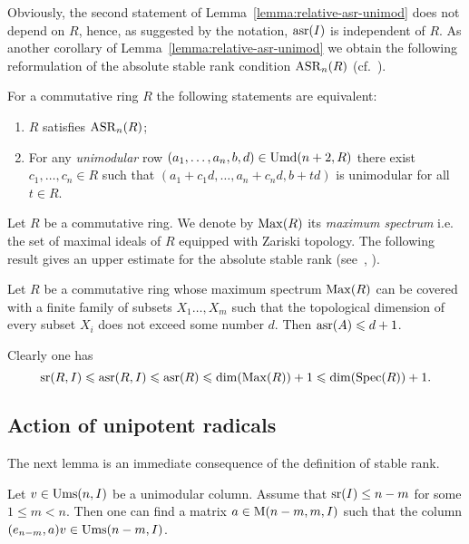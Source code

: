 Obviously, the second statement of Lemma~\ref{lemma:relative-asr-unimod} does not depend on $R$, hence, as suggested by the notation, $\operatorname{asr}(I)$ is independent of $R$.
As another corollary of Lemma~\ref{lemma:relative-asr-unimod} we obtain the following reformulation of the absolute stable rank condition $\operatorname{ASR}_n(R)$ (cf.~\cite[\S~1]{Pl98}).
\begin{cor}[A.~Bak] For a commutative ring $R$ the following statements are equivalent:
\begin{enumerate}
 \item\label{asr_Stein} $R$ satisfies $\operatorname{ASR}_n(R)$;
 \item\label{asr_Bak} For any \emph{unimodular} row $(a_1,\ldots,a_n,b,d)\in\operatorname{Umd}(n+2,R)$ there exist $c_1,\ldots,c_n\in R$ such that $(a_1+c_1d,\ldots,a_n+c_nd,b+td)$ is unimodular for all $t\in R$.
\end{enumerate}
\end{cor}

Let $R$ be a commutative ring. We denote by $\operatorname{Max}(R)$ its \emph{maximum spectrum} i.e. the set of maximal ideals of $R$ equipped with Zariski topology.
The following result gives an upper estimate for the absolute stable rank (see~\cite[Theorem~2.3]{EO}, \cite[Theorem~3.7]{MKV}).
\begin{thm}
Let $R$ be a commutative ring whose maximum spectrum $\operatorname{Max}(R)$ can be covered with a finite family of subsets $X_1\ldots, X_m$ such that the topological dimension of every subset $X_i$ does not exceed some number $d$. Then $\operatorname{asr}(A)\leqslant d+1$.
\end{thm}
Clearly one has
\[ \operatorname{sr}(R,I)\leqslant\operatorname{asr}(R,I)\leqslant\operatorname{asr}(R)\leqslant \dim(\operatorname{Max}(R))+1\leqslant\dim(\operatorname{Spec}(R))+1. \]

\subsection{Action of unipotent radicals}
The next lemma is an immediate consequence of the definition of stable rank.
\begin{lemma}\label{lemma:srUnip} Let $v\in\operatorname{Ums}(n, I)$ be a unimodular column. Assume that $\operatorname{sr}(I)\leq n-m$ for some $1\leqslant m < n$.
Then one can find a matrix $a\in \operatorname{M}(n-m,m,I)$ such that the column $(e_{n-m},a)v\in \operatorname{Ums}(n-m, I)$. \end{lemma} 

